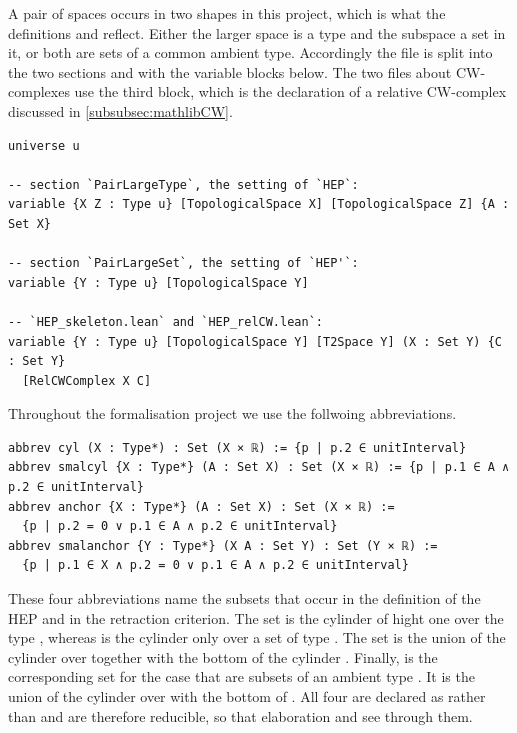 \documentclass[11pt, a4paper, english]{article}
\theoremstyle{plain}
\theoremstyle{definition}
\theoremstyle{remark}
\numberwithin{equation}{section}
\numberwithin{theorem}{section}
\begin{document}
A pair of spaces occurs in two shapes in this project, which is what the definitions  and  reflect. Either the larger space is a type and the subspace a set in it, or both are sets of a common ambient type. Accordingly the file  is split into the two sections  and  with the variable blocks below. The two files about CW-complexes use the third block, which is the declaration of a relative CW-complex discussed in \cref{subsubsec:mathlibCW}.

\begin{verbatim}
universe u

-- section `PairLargeType`, the setting of `HEP`:
variable {X Z : Type u} [TopologicalSpace X] [TopologicalSpace Z] {A : Set X}

-- section `PairLargeSet`, the setting of `HEP'`:
variable {Y : Type u} [TopologicalSpace Y]

-- `HEP_skeleton.lean` and `HEP_relCW.lean`:
variable {Y : Type u} [TopologicalSpace Y] [T2Space Y] (X : Set Y) {C : Set Y}
  [RelCWComplex X C]
\end{verbatim}

Throughout the formalisation project we use the follwoing abbreviations.

\begin{verbatim}
abbrev cyl (X : Type*) : Set (X × ℝ) := {p | p.2 ∈ unitInterval}
abbrev smalcyl {X : Type*} (A : Set X) : Set (X × ℝ) := {p | p.1 ∈ A ∧ p.2 ∈ unitInterval}
abbrev anchor {X : Type*} (A : Set X) : Set (X × ℝ) :=
  {p | p.2 = 0 ∨ p.1 ∈ A ∧ p.2 ∈ unitInterval}
abbrev smalanchor {Y : Type*} (X A : Set Y) : Set (Y × ℝ) :=
  {p | p.1 ∈ X ∧ p.2 = 0 ∨ p.1 ∈ A ∧ p.2 ∈ unitInterval}
\end{verbatim}

These four abbreviations name the subsets that occur in the definition of the HEP and in the retraction criterion. The set  is the cylinder of hight one over the type , whereas  is the cylinder only over a set  of type . The set  is the union of the cylinder over  together with the bottom of the cylinder . Finally,  is the corresponding set for the case that  are subsets of an ambient type . It  is the union of the cylinder over  with the bottom of . All four are declared as  rather than  and are therefore reducible, so that elaboration and  see through them.  \\
\end{document}
